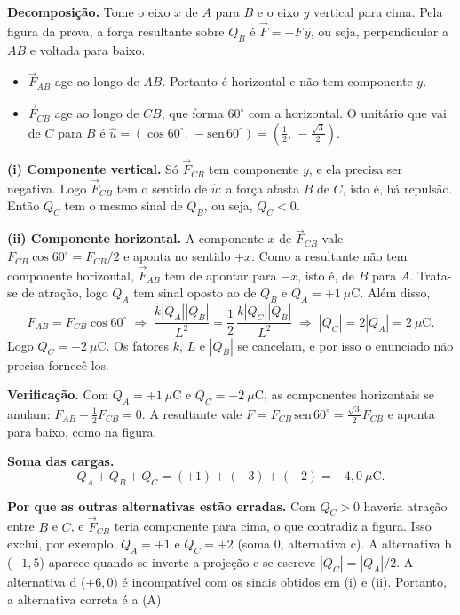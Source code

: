 \documentclass{article}%
\begin{document}
\textbf{Decomposição.} Tome o eixo $x$ de $A$ para $B$ e o eixo $y$ vertical para cima. Pela figura da prova, a força resultante sobre $Q_B$ é $\vec F=-F\,\hat y$, ou seja, perpendicular a $AB$ e voltada para baixo.
\begin{itemize}
\item $\vec F_{AB}$ age ao longo de $AB$. Portanto é horizontal e não tem componente $y$.
\item $\vec F_{CB}$ age ao longo de $CB$, que forma $60^\circ$ com a horizontal. O unitário que vai de $C$ para $B$ é $\hat u=(\cos 60^\circ,\,-\text{sen}\,60^\circ)=\left(\tfrac12,\,-\tfrac{\sqrt3}{2}\right)$.
\end{itemize}

\textbf{(i) Componente vertical.} Só $\vec F_{CB}$ tem componente $y$, e ela precisa ser negativa. Logo $\vec F_{CB}$ tem o sentido de $\hat u$: a força afasta $B$ de $C$, isto é, há repulsão. Então $Q_C$ tem o mesmo sinal de $Q_B$, ou seja, $Q_C<0$.

\textbf{(ii) Componente horizontal.} A componente $x$ de $\vec F_{CB}$ vale $F_{CB}\cos 60^\circ=F_{CB}/2$ e aponta no sentido $+x$. Como a resultante não tem componente horizontal, $\vec F_{AB}$ tem de apontar para $-x$, isto é, de $B$ para $A$. Trata-se de atração, logo $Q_A$ tem sinal oposto ao de $Q_B$ e $Q_A=+1\ \mu\text{C}$. Além disso,
\[
F_{AB}=F_{CB}\cos 60^\circ
\;\Longrightarrow\;
\frac{k|Q_A||Q_B|}{L^2}=\frac12\,\frac{k|Q_C||Q_B|}{L^2}
\;\Longrightarrow\;
|Q_C|=2|Q_A|=2\ \mu\text{C}.
\]
Logo $Q_C=-2\ \mu\text{C}$. Os fatores $k$, $L$ e $|Q_B|$ se cancelam, e por isso o enunciado não precisa fornecê-los.

\textbf{Verificação.} Com $Q_A=+1\ \mu\text{C}$ e $Q_C=-2\ \mu\text{C}$, as componentes horizontais se anulam: $F_{AB}-\tfrac12F_{CB}=0$. A resultante vale $F=F_{CB}\,\text{sen}\,60^\circ=\tfrac{\sqrt3}{2}F_{CB}$ e aponta para baixo, como na figura.

\textbf{Soma das cargas.}
\[
Q_A+Q_B+Q_C=(+1)+(-3)+(-2)=-4{,}0\ \mu\text{C}.
\]

\textbf{Por que as outras alternativas estão erradas.} Com $Q_C>0$ haveria atração entre $B$ e $C$, e $\vec F_{CB}$ teria componente para cima, o que contradiz a figura. Isso exclui, por exemplo, $Q_A=+1$ e $Q_C=+2$ (soma $0$, alternativa c). A alternativa b ($-1{,}5$) aparece quando se inverte a projeção e se escreve $|Q_C|=|Q_A|/2$. A alternativa d ($+6{,}0$) é incompatível com os sinais obtidos em (i) e (ii). Portanto, a alternativa correta é a (A).
\end{document}
